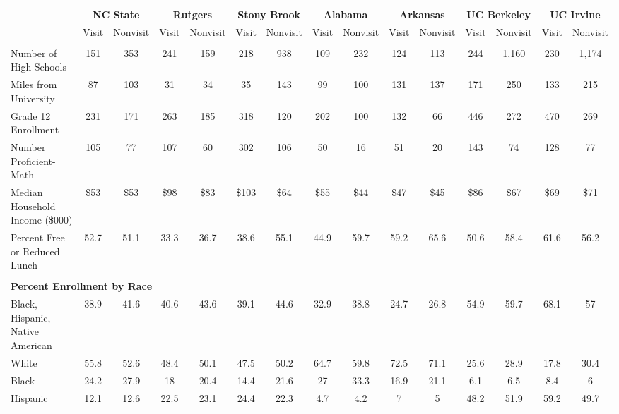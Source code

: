 \begin{tabular*}{\linewidth}{@{\extracolsep{\fill} } lcccccccccccccc}%
&\multicolumn{2}{c}{\bfseries NC State}&\multicolumn{2}{c}{\bfseries Rutgers}&\multicolumn{2}{c}{\bfseries Stony Brook}&\multicolumn{2}{c}{\bfseries Alabama}&\multicolumn{2}{c}{\bfseries Arkansas}&\multicolumn{2}{c}{\bfseries UC Berkeley}&\multicolumn{2}{c}{\bfseries UC Irvine}\\%
&Visit&\multicolumn{1}{l}{Nonvisit}&Visit&\multicolumn{1}{l}{Nonvisit}&Visit&\multicolumn{1}{l}{Nonvisit}&Visit&\multicolumn{1}{l}{Nonvisit}&Visit&\multicolumn{1}{l}{Nonvisit}&Visit&\multicolumn{1}{l}{Nonvisit}&Visit&\multicolumn{1}{l}{Nonvisit}\\%
\hline%
&&&&&&&&&&&&&&\\%
\hspace{0cm}Number of High Schools&151&353&241&159&218&938&109&232&124&113&244&1,160&230&1,174\\%
\hspace{0cm}Miles from University&87&103&31&34&35&143&99&100&131&137&171&250&133&215\\%
\hspace{0cm}Grade 12 Enrollment&231&171&263&185&318&120&202&100&132&66&446&272&470&269\\%
\hspace{0cm}Number Proficient{-}Math&105&77&107&60&302&106&50&16&51&20&143&74&128&77\\%
\hspace{0cm}Median Household Income (\$000)&\$53&\$53&\$98&\$83&\$103&\$64&\$55&\$44&\$47&\$45&\$86&\$67&\$69&\$71\\%
\hspace{0cm}Percent Free or Reduced Lunch&52.7&51.1&33.3&36.7&38.6&55.1&44.9&59.7&59.2&65.6&50.6&58.4&61.6&56.2\\%
&&&&&&&&&&&&&&\\%
\multicolumn{15}{l}{\bfseries Percent Enrollment by Race}\\%
\hspace{0.2cm}Black, Hispanic, Native American&38.9&41.6&40.6&43.6&39.1&44.6&32.9&38.8&24.7&26.8&54.9&59.7&68.1&57\\%
\hspace{0.2cm}White&55.8&52.6&48.4&50.1&47.5&50.2&64.7&59.8&72.5&71.1&25.6&28.9&17.8&30.4\\%
\hspace{0.2cm}Black&24.2&27.9&18&20.4&14.4&21.6&27&33.3&16.9&21.1&6.1&6.5&8.4&6\\%
\hspace{0.2cm}Hispanic&12.1&12.6&22.5&23.1&24.4&22.3&4.7&4.2&7&5&48.2&51.9&59.2&49.7\\%

\end{tabular*}
